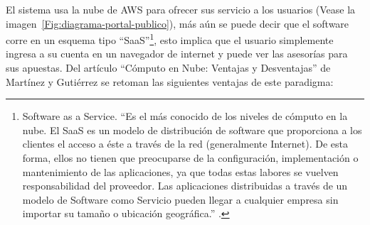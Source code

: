 El sistema usa la nube de AWS para ofrecer sus servicio a los usuarios (Vease la imagen~\ref{Fig:diagrama-portal-publico}), más aún se puede decir que el software corre en un esquema tipo ``SaaS''\footnote{Software as a Service. ``Es el más conocido de los niveles de cómputo en la nube. El SaaS es un modelo de distribución de software que proporciona a los clientes el acceso a éste a través de la red (generalmente Internet). De esta forma, ellos no tienen que preocuparse de la configuración, implementación o mantenimiento de las aplicaciones, ya que todas estas labores se vuelven responsabilidad del proveedor. Las aplicaciones distribuidas a través de un modelo de Software como Servicio pueden llegar a cualquier empresa sin importar su tamaño o ubicación geográfica.'' \cite{godinez2010nube}.}, esto implica que el usuario simplemente ingresa a su cuenta en un navegador de internet y puede ver las asesorías para sus apuestas.
Del artículo ``Cómputo en Nube: Ventajas y Desventajas'' de Martínez y Gutiérrez \cite{godinez2010nube}  se retoman las siguientes ventajas de este paradigma:
